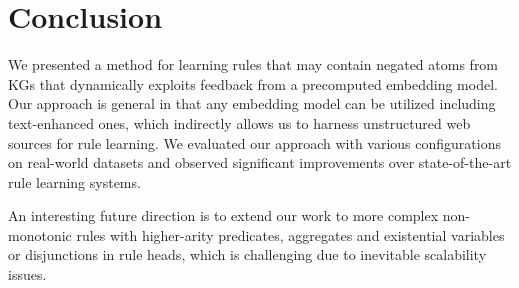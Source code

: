
\section{Conclusion}

We presented a method for learning rules that may contain negated atoms from KGs that
dynamically exploits feedback from a precomputed embedding model. 
Our approach is general in that any embedding model can be utilized including text-enhanced ones, which indirectly allows us to 
harness
unstructured 
web sources 
for rule learning.
 We evaluated our approach with various configurations on real-world datasets and observed significant improvements
over state-of-the-art rule learning systems.

An interesting future direction is to extend our work to more complex non-monotonic rules with higher-arity predicates,
aggregates and existential variables or disjunctions in rule heads, which is challenging due to inevitable scalability issues.

